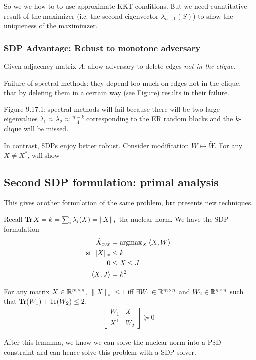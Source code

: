 So we we how to to use approximate KKT conditions. But we need quantitative result
of the maximizer (i.e. the second eigenvector $\lambda_{n-1}(S)$) to show the
uniqueness of the maximimzer.

\subsubsection{SDP Advantage: Robust to monotone adversary}

Given adjacency matrix $A$, allow adversary to delete edges \emph{not in the clique}.

Failure of spectral methods: they depend too much on edges not in the clique, that
by deleting them in a certain way (see Figure) results in their failure.

Figure 9.17.1: spectral methods will fail because there will be two large eigenvalues
$\lambda_1 \approx \lambda_2 \approx \frac{n-k}{4}$ corresponding to the ER random
blocks and the $k$-clique will be missed.

In contrast, SDPs enjoy better robust. Consider modification $W \mapsto \tilde{W}$.
For any $X \neq X^*$, will show

\subsection{Second SDP formulation: primal analysis}%

This gives another formulation of the same problem, but presents new
techniques.

Recall $\operatorname{Tr} X = k = \sum_i \lambda_i(X) = \|X\|_\ast$ the nuclear norm.
We have the SDP formulation
\begin{align}
  \hat{X}_{cvx} &= \operatorname{argmax}_X \braket{X,W} \\
  \text{st } \|X\|_\ast &\leq k \\
  0 &\leq X \leq J \\
  \braket{X,J} &= k^2
\end{align}


\begin{lemma}
  For any matrix $X \in \mathbb{R}^{m \times n}$,
  $\|X\|_\ast \leq 1$ iff
  $\exists W_1 \in \mathbb{R}^{m \times n}$
  and $W_2 \in \mathbb{R}^{n \times n}$ such that $\operatorname{Tr}(W_1) + \operatorname{Tr}(W_2) \leq 2$.
  \begin{align}
    \begin{bmatrix}
      W_1 & X \\
      X^\top & W_2
    \end{bmatrix} \succeq 0
  \end{align}

  After this lemmma, we know we can solve the nuclear norm into a PSD constraint
  and can hence solve this problem with a SDP solver.
\end{lemma}

